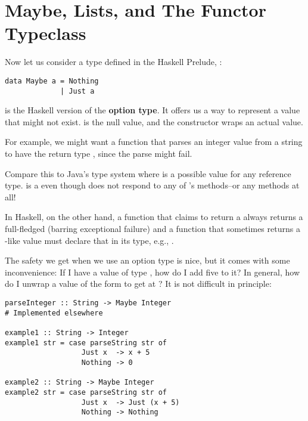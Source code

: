 \section{Maybe, Lists, and The Functor Typeclass}

Now let us consider a type defined in the Haskell Prelude, :

\begin{lstlisting}
data Maybe a = Nothing
             | Just a
\end{lstlisting}

\begin{notelist}
    \item {} is the Haskell version of the \textbf{option type}. It offers us a way to
          represent a value that might not exist.  is the null value, and
          the  constructor wraps an actual value.
    \item For example, we might want a function that parses an integer value from a string to
          have the return type , since the parse might fail.
    \item Compare this to Java's type system where  is a possible value for any
          reference type.  is a  even though  does not respond to  
          any of 's methods--or any methods at all!
    \item In Haskell, on the other hand, a function that claims to return a  always returns
          a full-fledged  (barring exceptional failure) and a function that sometimes
          returns a -like value must declare that in its type, e.g., .
\end{notelist}

The safety we get when we use an option type is nice, but it comes with some inconvenience: If I 
have a value of type , how do I add five to it? In general, how do I unwrap
a value of the form  to get at ? It is not difficult in principle:

\begin{lstlisting}
parseInteger :: String -> Maybe Integer
# Implemented elsewhere

example1 :: String -> Integer
example1 str = case parseString str of
                  Just x  -> x + 5
                  Nothing -> 0

example2 :: String -> Maybe Integer
example2 str = case parseString str of
                  Just x  -> Just (x + 5)
                  Nothing -> Nothing
\end{lstlisting}

